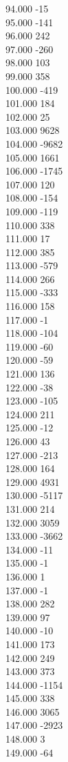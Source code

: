 { 94.000	-15 \\
 95.000	-141 \\
 96.000	242 \\
 97.000	-260 \\
 98.000	103 \\
 99.000	358 \\
 100.000	-419 \\
 101.000	184 \\
 102.000	25 \\
 103.000	9628 \\
 104.000	-9682 \\
 105.000	1661 \\
 106.000	-1745 \\
 107.000	120 \\
 108.000	-154 \\
 109.000	-119 \\
 110.000	338 \\
 111.000	17 \\
 112.000	385 \\
 113.000	-579 \\
 114.000	266 \\
 115.000	-333 \\
 116.000	158 \\
 117.000	-1 \\
 118.000	-104 \\
 119.000	-60 \\
 120.000	-59 \\
 121.000	136 \\
 122.000	-38 \\
 123.000	-105 \\
 124.000	211 \\
 125.000	-12 \\
 126.000	43 \\
 127.000	-213 \\
 128.000	164 \\
 129.000	4931 \\
 130.000	-5117 \\
 131.000	214 \\
 132.000	3059 \\
 133.000	-3662 \\
 134.000	-11 \\
 135.000	-1 \\
 136.000	1 \\
 137.000	-1 \\
 138.000	282 \\
 139.000	97 \\
 140.000	-10 \\
 141.000	173 \\
 142.000	249 \\
 143.000	373 \\
 144.000	-1154 \\
 145.000	338 \\
 146.000	3065 \\
 147.000	-2923 \\
 148.000	3 \\
 149.000	-64 \\
}

